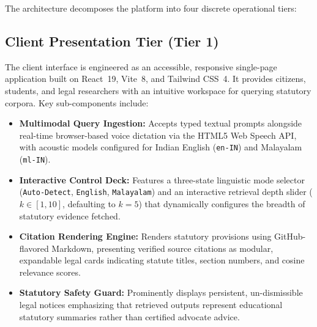 \documentclass[12pt,a4paper]{report}
\begin{document}
The architecture decomposes the platform into four discrete operational tiers:

\subsection{Client Presentation Tier (Tier 1)}
The client interface is engineered as an accessible, responsive single-page application built on React~19, Vite~8, and Tailwind CSS~4. It provides citizens, students, and legal researchers with an intuitive workspace for querying statutory corpora. Key sub-components include:
\begin{itemize}
    \item \textbf{Multimodal Query Ingestion:} Accepts typed textual prompts alongside real-time browser-based voice dictation via the HTML5 Web Speech API, with acoustic models configured for Indian English (\texttt{en-IN}) and Malayalam (\texttt{ml-IN}).
    \item \textbf{Interactive Control Deck:} Features a three-state linguistic mode selector (\texttt{Auto-Detect}, \texttt{English}, \texttt{Malayalam}) and an interactive retrieval depth slider ($k \in [1, 10]$, defaulting to $k = 5$) that dynamically configures the breadth of statutory evidence fetched.
    \item \textbf{Citation Rendering Engine:} Renders statutory provisions using GitHub-flavored Markdown, presenting verified source citations as modular, expandable legal cards indicating statute titles, section numbers, and cosine relevance scores.
    \item \textbf{Statutory Safety Guard:} Prominently displays persistent, un-dismissible legal notices emphasizing that retrieved outputs represent educational statutory summaries rather than certified advocate advice.
\end{itemize}
\end{document}
